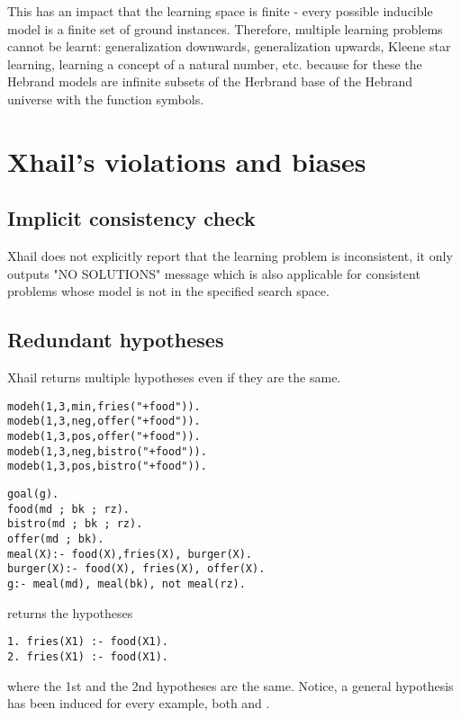 This has an impact that the learning space is finite - every possible inducible model is a finite set of ground instances. Therefore, multiple learning problems cannot be learnt: generalization downwards, generalization upwards, Kleene star learning, learning a concept of a natural number, etc. because for these the Hebrand models are infinite subsets of the Herbrand base of the Hebrand universe with the function symbols.

\section{Xhail's violations and biases}

\subsection{Implicit consistency check}\label{xhail_implicit_consistency_check}
Xhail does not explicitly report that the learning problem is inconsistent, it only outputs "NO SOLUTIONS" message which is also applicable for consistent problems whose model is not in the specified search space.

\subsection{Redundant hypotheses}\label{xhail_redundant_hypotheses}
Xhail returns multiple hypotheses even if they are the same.

\begin{minipage}[t]{.43\textwidth}
\begin{lstlisting}
modeh(1,3,min,fries("+food")).
modeb(1,3,neg,offer("+food")).
modeb(1,3,pos,offer("+food")).
modeb(1,3,neg,bistro("+food")).
modeb(1,3,pos,bistro("+food")).
\end{lstlisting}
\end{minipage}
\begin{minipage}[t]{.20\textwidth}
\begin{lstlisting}
goal(g).
food(md ; bk ; rz).
bistro(md ; bk ; rz).
offer(md ; bk).
meal(X):- food(X),fries(X), burger(X).
burger(X):- food(X), fries(X), offer(X).
g:- meal(md), meal(bk), not meal(rz).
\end{lstlisting}
\end{minipage}

returns the hypotheses

\begin{lstlisting}
1. fries(X1) :- food(X1).
2. fries(X1) :- food(X1).
\end{lstlisting}
where the 1st and the 2nd hypotheses are the same. Notice, a general hypothesis has been induced for every example, both  and .

